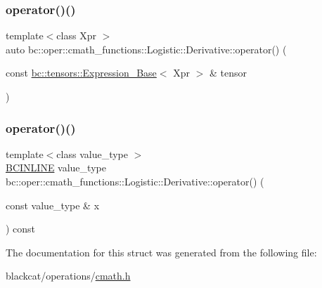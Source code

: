 \mbox{\label{structbc_1_1oper_1_1cmath__functions_1_1Logistic_1_1Derivative_aaec7e71698782070dd4409aba9f55120}} 
\subsubsection{\texorpdfstring{operator()()}{operator()()}\hspace{0.1cm}{\footnotesize\ttfamily [2/3]}}
{\footnotesize\ttfamily template$<$class Xpr $>$ \\
auto bc\+::oper\+::cmath\+\_\+functions\+::\+Logistic\+::\+Derivative\+::operator() (\begin{DoxyParamCaption}\item[{const \hyperlink{classbc_1_1tensors_1_1Expression__Base}{bc\+::tensors\+::\+Expression\+\_\+\+Base}$<$ Xpr $>$ \&}]{tensor }\end{DoxyParamCaption})\hspace{0.3cm}{\ttfamily [inline]}}

\mbox{\label{structbc_1_1oper_1_1cmath__functions_1_1Logistic_1_1Derivative_a2b3b2693acf6288837c45fdbde6a44f4}} 
\subsubsection{\texorpdfstring{operator()()}{operator()()}\hspace{0.1cm}{\footnotesize\ttfamily [3/3]}}
{\footnotesize\ttfamily template$<$class value\+\_\+type $>$ \\
\hyperlink{common_8h_a6699e8b0449da5c0fafb878e59c1d4b1}{B\+C\+I\+N\+L\+I\+NE} value\+\_\+type bc\+::oper\+::cmath\+\_\+functions\+::\+Logistic\+::\+Derivative\+::operator() (\begin{DoxyParamCaption}\item[{const value\+\_\+type \&}]{x }\end{DoxyParamCaption}) const\hspace{0.3cm}{\ttfamily [inline]}}



The documentation for this struct was generated from the following file\+:\begin{DoxyCompactItemize}
\item 
blackcat/operations/\hyperlink{cmath_8h}{cmath.\+h}\end{DoxyCompactItemize}
